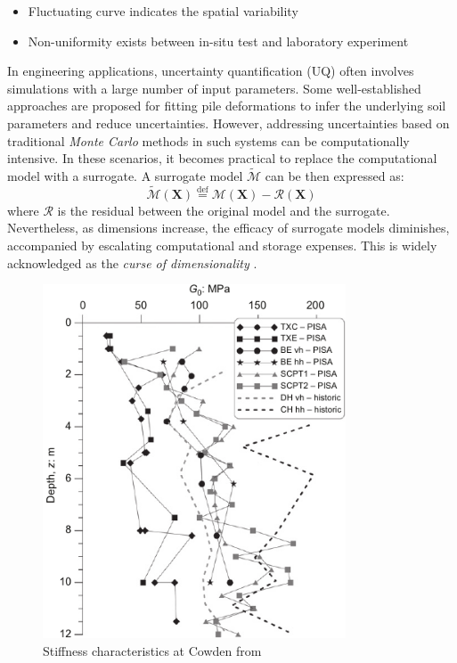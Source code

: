 
\begin{itemize}[left=0pt]

    \item Fluctuating curve indicates the spatial variability
    \item Non-uniformity exists between in-situ test and laboratory experiment

\end{itemize}
\vspace{0.2cm}


In engineering applications, uncertainty quantification (UQ) often involves simulations with a large number of input parameters. Some well-established approaches are proposed for fitting pile deformations to infer the underlying soil parameters and reduce uncertainties. However, addressing uncertainties based on traditional \textit{Monte Carlo} methods in such systems can be computationally intensive. In these scenarios, it becomes practical to replace the computational model with a surrogate.  A surrogate model $\tilde{\mathcal{M}}$ can be then expressed as:
\begin{equation}
\label{eq:surrogate_model}
    \tilde{\mathcal{M}}(\boldsymbol{X})  \overset{\mathrm{def}}{=} \mathcal{M}(\boldsymbol{X}) - \mathcal{R}(\boldsymbol{X})
\end{equation}
where $\mathcal{R}$ is the residual between the original model and the surrogate. Nevertheless, as dimensions increase, the efficacy of surrogate models diminishes, accompanied by escalating computational and storage expenses. This is widely acknowledged as the \textit{curse of dimensionality} \citep{verleysen2005}. 


\begin{figure}[htbp]
    \center
    \includegraphics[width = 90mm]{Figures/figure-Cowden.pdf}
    \caption{Stiffness characteristics at Cowden from \protect\cite{zdravkovic2020}}
    \label{fig: Cowden_cpt}
\end{figure}






